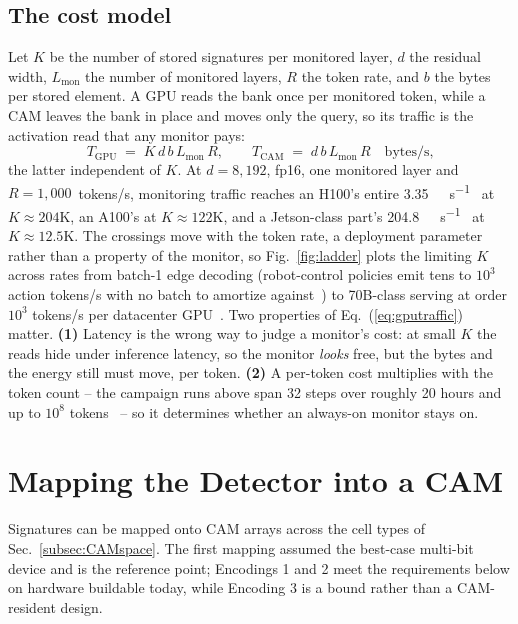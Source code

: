 \documentclass[conference]{IEEEtran}
\newcommand{\cam}{{CAM}\xspace}
\begin{document}
\subsection{The cost model}
\label{sec:Scaling}
\label{subsec:CostModel}
\label{subsec:Ladder}
Let $K$ be the number of stored signatures per monitored layer, $d$
the residual width, $L_{\mathrm{mon}}$ the number of monitored
layers, $R$ the token rate, and $b$ the bytes per stored element. A
GPU reads the bank once per monitored token, while a \cam leaves the
bank in place and moves only the query, so its traffic is the
activation read that any monitor pays:
%
\begin{equation}
T_{\mathrm{GPU}} \;=\; K \, d \, b \, L_{\mathrm{mon}} \, R, \qquad
T_{\mathrm{CAM}} \;=\; d \, b \, L_{\mathrm{mon}} \, R
\quad\text{bytes/s,}
\label{eq:gputraffic}
\end{equation}
%
the latter independent of $K$. At $d=8{,}192$, fp16, one monitored
layer and $R=1{,}000$~tokens/s, monitoring traffic reaches an H100's
entire \qty{3.35}{\tera\byte\per\second}~\cite{nvidia_h100} at
$K\!\approx\!204$K, an A100's at $K\!\approx\!122$K, and a
Jetson-class part's
\qty{204.8}{\giga\byte\per\second}~\cite{nvidia_orin} at
$K\!\approx\!12.5$K. The crossings move with the token rate, a
deployment parameter rather than a property of the monitor, so
Fig.~\ref{fig:ladder} plots the limiting $K$ across rates from
batch-1 edge decoding (robot-control policies emit tens to $10^{3}$
action tokens/s with no batch to amortize
against~\cite{vlaperf2026}) to 70B-class serving at order $10^{3}$
tokens/s per datacenter GPU~\cite{lyceum2026tps}. Two properties of
Eq.~(\ref{eq:gputraffic}) matter. {\bf (1)} Latency is the wrong
way to judge a monitor's cost: at small $K$ the reads hide under
inference latency, so the monitor \emph{looks} free, but the bytes
and the energy still must move, per token. {\bf (2)} A per-token
cost multiplies with the token count -- the campaign runs above span
32 steps over roughly 20 hours and up to $10^{8}$
tokens~\cite{aisi2026cyber} -- so it determines whether an always-on
monitor stays on.

\section{Mapping the Detector into a CAM}
\label{sec:Mapping}
Signatures can be mapped onto \cam arrays across the cell types of
Sec.~\ref{subsec:CAMspace}. The first mapping assumed the best-case
multi-bit device and is the reference point; Encodings 1 and 2 meet
the requirements below on hardware buildable today, while Encoding 3
is a bound rather than a \cam-resident design.
\end{document}
